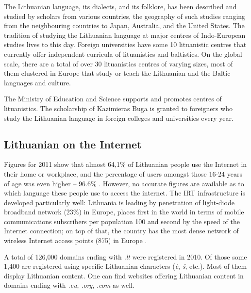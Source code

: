 \begin{multicols}{2}

The Lithuanian language, its dialects, and its folklore, has been described and studied by scholars from various countries, the geography of such studies ranging from the neighbouring countries to Japan, Australia, and the United States. The tradition of studying the Lithuanian language at major centres of Indo-European studies lives to this day. Foreign universities have some 10 lituanistic centres that currently offer independent curricula of lituanistics and baltistics. On the global scale, there are a total of over 30 lituanistics centres of varying sizes, most of them clustered in Europe that study or teach the Lithuanian and the Baltic languages and culture.

The Ministry of Education and Science supports and promotes centres of lituanistics. The scholarship of Kazimieras Būga is granted to foreigners who study the Lithuanian language in foreign colleges and universities every year.

\subsection{Lithuanian on the Internet}

 Figures for 2011 show that almost 64,1\% of Lithuanian people use the Internet in their home or workplace, and the percentage of users amongst those 16-24 years of age was even higher – 96.6\% \cite{stat}.  However, no accurate figures are available as to which language these people use to access the internet. The IRT infrastructure is developed particularly well: Lithuania is leading by penetration of light-diode broadband network (23\%) in Europe, places first in the world in terms of mobile communications subscribers per population 100 and second by the speed of the Internet connection; on top of that, the country has the most dense network of wireless Internet access points (875) in Europe \cite{invest}.


A total of 126,000 domains ending with \textit{.lt}  were registered in 2010. Of those some 1,400 are registered using specific Lithuanian characters (\textit{ė}, \textit{š}, etc.). Most of them display Lithuanian content. One can find websites offering Lithuanian content in domains ending with \textit{.eu}, \textit{.org}, \textit{.com} as well.


\end{multicols}
